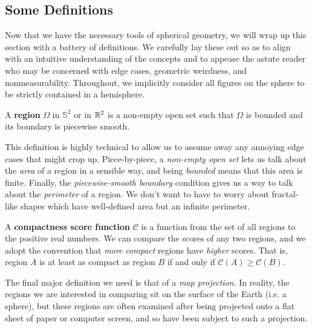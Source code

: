 \subsection{Some Definitions}

Now that we have the necessary tools of spherical geometry, we will wrap up this section with a battery of definitions. 
We carefully lay these out so
as to align with an intuitive understanding of the concepts and to
appease the astute reader who may be concerned with edge cases,
geometric weirdness, and nonmeasurability. 
Throughout, we implicitly consider all figures on the sphere to be strictly contained in a hemisphere.








\begin{definition}
	A \textbf{region} $\Omega$ in $\mathbb{S}^2$ or 
	in $\mathbb{R}^2$ is a non-empty open set such that $\Omega$ is bounded and its boundary is piecewise smooth.
\end{definition}

This definition is highly technical to allow us to assume away any annoying edge 
cases that might crop up.  Piece-by-piece, a \textit{non-empty open set} lets us 
talk about the \textit{area} of a region in a sensible way, and being \textit{bounded} means that this area is finite.  Finally, the 
\textit{piecewise-smooth boundary} condition gives us a way to talk about the \textit{perimeter} 
of a region.  We don't want to have to worry about fractal-like shapes which have well-defined 
area but an infinite perimeter.










\begin{definition}
A \textbf{compactness score function} $\mathcal{C}$ is a function from
the set of all regions to the positive real numbers.  We can compare 
the scores of any two regions, and we adopt the convention that 
\textit{more compact} regions have \textit{higher} scores.  That is,
region $A$ is at least as compact as region $B$ if and only if 
$\mathcal{C}(A)\geq    \mathcal{C}(B)$.
\end{definition}

The final major definition we need is that of a \textit{map
projection}.  In reality, the regions we are interested in comparing
sit on the surface of the Earth (i.e. a sphere), but these regions are
often examined after being projected onto a flat sheet of paper or
computer screen, and so have been subject to such a projection.


